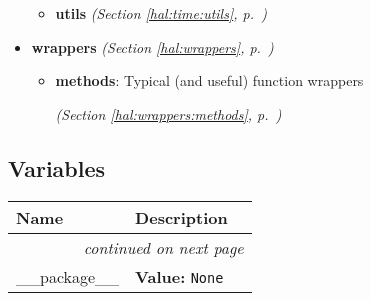\begin{itemize}
\begin{itemize}
    \item \textbf{utils}
  \textit{(Section \ref{hal:time:utils}, p.~\pageref{hal:time:utils})}

  \end{itemize}
\item \textbf{wrappers}
  \textit{(Section \ref{hal:wrappers}, p.~\pageref{hal:wrappers})}

  \begin{itemize}
\setlength{\parskip}{0ex}
    \item \textbf{methods}: Typical (and useful) function wrappers 


  \textit{(Section \ref{hal:wrappers:methods}, p.~\pageref{hal:wrappers:methods})}

  \end{itemize}
\end{itemize}



  \subsection{Variables}

    \vspace{-1cm}
\hspace{\varindent}\begin{longtable}{|p{\varnamewidth}|p{\vardescrwidth}|l}
\cline{1-2}
\cline{1-2} \centering \textbf{Name} & \centering \textbf{Description}& \\
\cline{1-2}
\endhead\cline{1-2}\multicolumn{3}{r}{\small\textit{continued on next page}}\\\endfoot\cline{1-2}
\endlastfoot\raggedright \_\-\_\-p\-a\-c\-k\-a\-g\-e\-\_\-\_\- & \raggedright \textbf{Value:} 
{\tt None}&\\
\cline{1-2}
\end{longtable}

